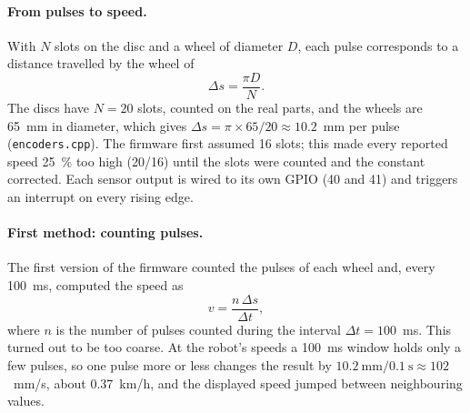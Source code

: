\paragraph{From pulses to speed.} With \(N\) slots on the disc and a wheel of diameter
\(D\), each pulse corresponds to a distance travelled by the wheel of
\begin{equation}
  \Delta s = \frac{\pi D}{N}.
  \label{eq:mm-per-pulse}
\end{equation}
The discs have \(N = 20\) slots, counted on the real parts, and the wheels are 65~mm in
diameter, which gives \(\Delta s = \pi \times 65 / 20 \approx 10.2\)~mm per pulse
(\texttt{encoders.cpp}). The firmware first assumed 16 slots; this made every reported speed
25~\% too high (20/16) until the
slots were counted and the constant corrected. Each sensor output
is wired to its own GPIO (40 and 41) and triggers an interrupt on every rising edge.

\paragraph{First method: counting pulses.} The first version of the firmware counted the
pulses of each wheel and, every 100~ms, computed the speed as
\begin{equation}
  v = \frac{n \, \Delta s}{\Delta t},
\end{equation}
where \(n\) is the number of pulses counted during the interval \(\Delta t = 100\)~ms.
This turned out to be too coarse. At the robot's speeds a 100~ms window holds only a few
pulses, so one pulse more or less changes the result by
\(10.2~\text{mm} / 0.1~\text{s} \approx 102\)~mm/s, about 0.37~km/h, and the displayed speed
jumped between neighbouring values.

